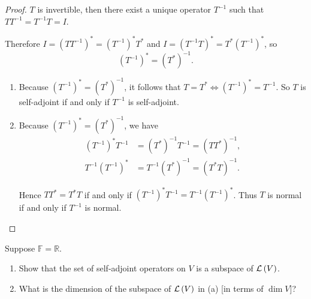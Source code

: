 \begin{proof}
    $T$ is invertible, then there exist a unique operator $T^{-1}$ such that $TT^{-1} = T^{-1}T = I$.

    Therefore $I = {(TT^{-1})}^{*} = {(T^{-1})}^{*}T^{*}$ and $I = {(T^{-1}T)}^{*} = T^{*}{(T^{-1})}^{*}$, so
    \[
        {(T^{-1})}^{*} = {(T^{*})}^{-1}.
    \]

    \begin{enumerate}[label={(\alph*)}]
        \item Because ${(T^{-1})}^{*} = {(T^{*})}^{-1}$, it follows that $T = T^{*} \Longleftrightarrow {(T^{-1})}^{*} = T^{-1}$. So $T$ is self-adjoint if and only if $T^{-1}$ is self-adjoint.
        \item Because ${(T^{-1})}^{*} = {(T^{*})}^{-1}$, we have
              \begin{align*}
                  {(T^{-1})}^{*}T^{-1} & = {(T^{*})}^{-1}T^{-1} = {(TT^{*})}^{-1}, \\
                  T^{-1}{(T^{-1})}^{*} & = T^{-1}{(T^{*})}^{-1} = {(T^{*}T)}^{-1}.
              \end{align*}

              Hence $TT^{*} = T^{*}T$ if and only if ${(T^{-1})}^{*}T^{-1} = T^{-1}{(T^{-1})}^{*}$. Thus $T$ is normal if and only if $T^{-1}$ is normal.
    \end{enumerate}
\end{proof}
\newpage

\begin{exercise}
    Suppose $\mathbb{F} = \mathbb{R}$.
    \begin{enumerate}[label={(\alph*)}]
        \item Show that the set of self-adjoint operators on $V$ is a subspace of $\mathcal{L}\left({V}\right)$.
        \item What is the dimension of the subspace of $\mathcal{L}\left({V}\right)$ in (a) [in terms of $\dim V$]?
    \end{enumerate}
\end{exercise}


